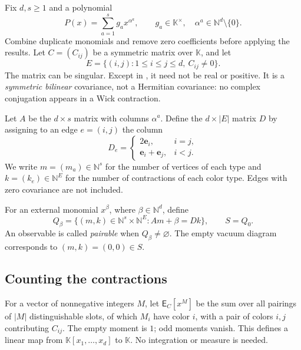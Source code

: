 \documentclass[11pt,letterpaper]{article}
\numberwithin{equation}{section}
\theoremstyle{definition}
\theoremstyle{remark}
\newcommand{\N}{\mathbb N}
\newcommand{\K}{\mathbb K}
\newcommand{\EE}{\mathsf E}
\newcommand{\ve}{\mathbf e}
\newcommand{\abs}[1]{\lvert#1\rvert}
\begin{document}
Fix $d,s\ge1$ and a polynomial
\begin{equation}
 P(x)=\sum_{a=1}^s g_a x^{\alpha^a},\qquad
 g_a\in\K^\times,\quad
 \alpha^a\in\N^d\setminus\{0\}.
 \label{wick:eq:interaction}
\end{equation}
Combine duplicate monomials and remove zero coefficients before applying
the results. Let $C=(C_{ij})$ be a symmetric matrix over $\K$, and let
\[
 E=\{(i,j):1\le i\le j\le d,\ C_{ij}\ne0\}.
\]
The matrix can be singular. Except in , it need not be real
or positive. It is a \emph{symmetric bilinear} covariance, not a Hermitian
covariance: no complex conjugation appears in a Wick contraction.

Let $A$ be the $d\times s$ matrix with columns $\alpha^a$. Define the
$d\times\abs E$ matrix $D$ by assigning to an edge $e=(i,j)$ the column
\[
 D_e=\begin{cases}
 2\ve_i,&i=j,\\
 \ve_i+\ve_j,&i<j.
 \end{cases}
\]
We write $m=(m_a)\in\N^s$ for the number of vertices of each type and
$k=(k_e)\in\N^E$ for the number of contractions of each color type. Edges
with zero covariance are not included.

For an external monomial $x^\beta$, where $\beta\in\N^d$, define
\begin{equation}
 Q_\beta=\{(m,k)\in\N^s\times\N^E:Am+\beta=Dk\},\qquad S=Q_0.
 \label{wick:eq:incidence}
\end{equation}
An observable is called \emph{pairable} when $Q_\beta\ne\varnothing$.
The empty vacuum diagram corresponds to $(m,k)=(0,0)\in S$.

\subsection{Counting the contractions}

For a vector of nonnegative integers $M$, let $\EE_C[x^M]$ be the sum over
all pairings of $\abs M$ distinguishable slots, of which $M_i$ have color $i$,
with a pair of colors $i,j$ contributing $C_{ij}$. The empty moment is $1$;
odd moments vanish. This defines a linear map from $\K[x_1,\ldots,x_d]$ to
$\K$. No integration or measure is needed.
\end{document}
